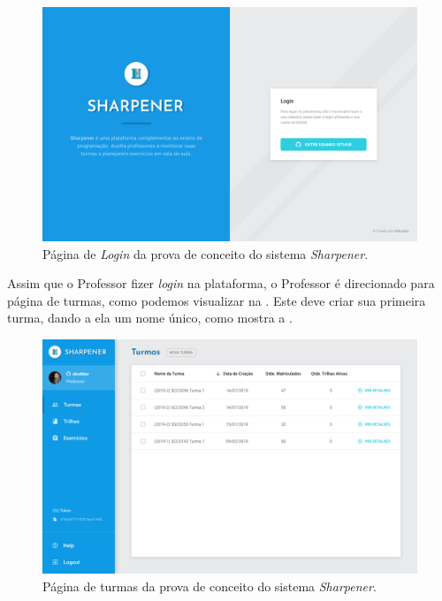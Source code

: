   \begin{figure}[htb]
    \centering
    \includegraphics[width=\linewidth]{images/mocks/login.png}
    \caption{Página de \emph{Login} da prova de conceito do sistema \emph{Sharpener}.}%
    \label{fig:login}
  \end{figure}

Assim que o Professor fizer \emph{login} na plataforma, o Professor é direcionado para página de turmas, como podemos visualizar na . 
Este deve criar sua primeira turma, dando a ela um nome único, como mostra a . 

 \begin{figure}[htpb]
    \centering
    \includegraphics[width=\linewidth]{images/mocks/turmaExpandido.png}
    \caption{Página de turmas da prova de conceito do sistema \emph{Sharpener}.}%
    \label{fig:turmas}
  \end{figure}
  

